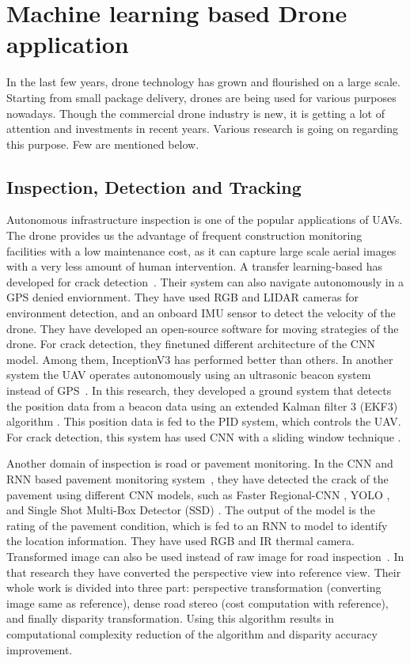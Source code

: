 \section{Machine learning based Drone application}
\label{applicationsection}
In the last few years, drone technology has grown and flourished on a large scale. Starting from small package delivery, drones are being used for various purposes nowadays. %
Though the commercial drone industry is new, it is getting a lot of attention and investments in recent years. Various research is going on regarding this purpose. Few are mentioned below.

\subsection{Inspection, Detection and Tracking}
Autonomous infrastructure inspection is one of the popular applications of UAVs. The drone provides us the advantage of frequent construction monitoring facilities with a low maintenance cost, as it can capture large scale aerial images with a very less amount of human intervention.
A transfer learning-based has developed for crack detection~\cite{kucuksubasi2018transfer}.  Their system can also navigate autonomously in a GPS denied enviornment. They have used RGB and LIDAR cameras for environment detection, and an onboard IMU sensor to detect the velocity of the drone. They have developed an open-source software for moving strategies of the drone. For crack detection, they finetuned different architecture of the CNN model. Among them, InceptionV3 has performed better than others.
In another system the UAV operates autonomously using an ultrasonic beacon system instead of GPS~\cite{kang2018autonomous}. In this research, they developed a ground system that detects the position data from a beacon data using an extended Kalman filter 3 (EKF3) algorithm \cite{willner1976kalman}. This position data is fed to the PID system, which controls the UAV. For crack detection, this system has used CNN with a sliding window technique \cite{cha2017deep}.

Another domain of inspection is road or pavement monitoring. In the CNN and RNN based pavement monitoring system~\cite{wu2018coupling}, they have detected the crack of the pavement using different CNN models, such as Faster Regional-CNN \cite{ren2015faster}, YOLO \cite{redmon2016you}, and Single Shot Multi-Box Detector (SSD) \cite{liu2016ssd}. The output of the model is the rating of the pavement condition, which is fed to an RNN to model to identify the location information. They have used RGB and IR thermal camera.
Transformed image can also be used instead of raw image for road inspection~\cite{fan2019real}. In that research they have converted the perspective view into reference view. Their whole work is divided into three part: perspective transformation (converting image same as reference), dense road stereo (cost computation with reference), and finally disparity transformation. Using this algorithm results in computational complexity reduction of the algorithm and disparity accuracy improvement. 

